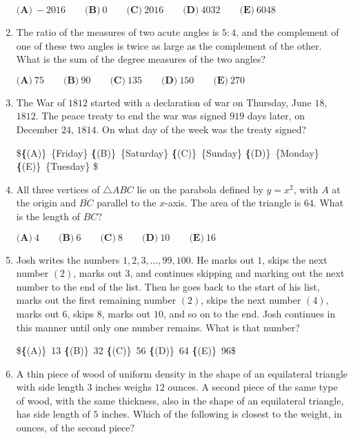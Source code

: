 \documentclass{article}
\begin{document}
\begin{enumerate}[label=\arabic*., itemsep=0.5em]
$\textbf{(A)}\ -2016\qquad\textbf{(B)}\ 0\qquad\textbf{(C)}\ 2016\qquad\textbf{(D)}\ 4032\qquad\textbf{(E)}\ 6048$\par \vspace{0.5em}\item The ratio of the measures of two acute angles is $5:4$, and the complement of one of these two angles is twice as large as the complement of the other. What is the sum of the degree measures of the two angles?

$\textbf{(A)}\ 75\qquad\textbf{(B)}\ 90\qquad\textbf{(C)}\ 135\qquad\textbf{(D)}\ 150\qquad\textbf{(E)}\ 270$\par \vspace{0.5em}\item The War of $1812$ started with a declaration of war on Thursday, June $18$, $1812$. The peace treaty to end the war was signed $919$ days later, on December $24$, $1814$. On what day of the week was the treaty signed? 

\$\textbf\{(A)\}\ \text\{Friday\} \qquad
\textbf\{(B)\}\ \text\{Saturday\} \qquad
\textbf\{(C)\}\ \text\{Sunday\} \qquad
\textbf\{(D)\}\ \text\{Monday\} \qquad
\textbf\{(E)\}\ \text\{Tuesday\} \$\par \vspace{0.5em}\item All three vertices of $\bigtriangleup ABC$ lie on the parabola defined by $y=x^2$, with $A$ at the origin and $\overline{BC}$ parallel to the $x$-axis. The area of the triangle is $64$. What is the length of $BC$?  

$\textbf{(A)}\ 4\qquad\textbf{(B)}\ 6\qquad\textbf{(C)}\ 8\qquad\textbf{(D)}\ 10\qquad\textbf{(E)}\ 16$\par \vspace{0.5em}\item Josh writes the numbers $1,2,3,\dots,99,100$. He marks out $1$, skips the next number $(2)$, marks out $3$, and continues skipping and marking out the next number to the end of the list. Then he goes back to the start of his list, marks out the first remaining number $(2)$, skips the next number $(4)$, marks out $6$, skips $8$, marks out $10$, and so on to the end. Josh continues in this manner until only one number remains. What is that number?

\$\textbf\{(A)\}\ 13 \qquad
\textbf\{(B)\}\ 32 \qquad
\textbf\{(C)\}\ 56 \qquad
\textbf\{(D)\}\ 64 \qquad
\textbf\{(E)\}\ 96\$\par \vspace{0.5em}\item A thin piece of wood of uniform density in the shape of an equilateral triangle with side length $3$ inches weighs $12$ ounces. A second piece of the same type of wood, with the same thickness, also in the shape of an equilateral triangle, has side length of $5$ inches. Which of the following is closest to the weight, in ounces, of the second piece?


\end{enumerate}
\end{document}
